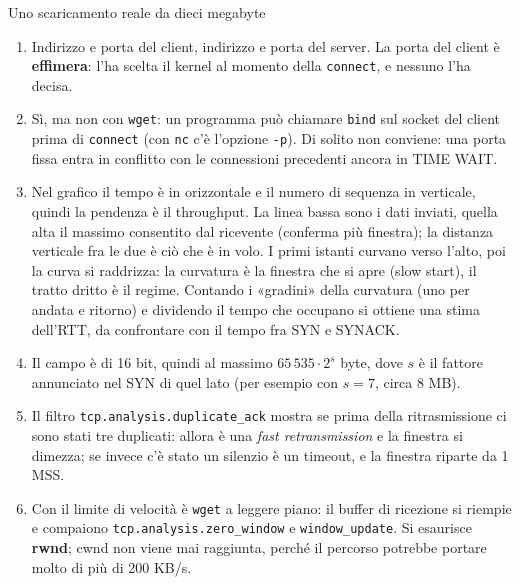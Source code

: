 \begin{esercizio}{Uno scaricamento reale da dieci megabyte}
\svolgimento
\begin{enumerate}[label=(\alph*)]
    \item Indirizzo e porta del client, indirizzo e porta del server. La porta del client è \textbf{effimera}: l'ha scelta il
          kernel al momento della \texttt{connect}, e nessuno l'ha decisa.
    \item Sì, ma non con \texttt{wget}: un programma può chiamare \texttt{bind} sul socket del client prima di
          \texttt{connect} (con \texttt{nc} c'è l'opzione \texttt{-p}). Di solito non conviene: una porta fissa entra in
          conflitto con le connessioni precedenti ancora in TIME WAIT.
    \item Nel grafico il tempo è in orizzontale e il numero di sequenza in verticale, quindi la pendenza è il throughput. La
          linea bassa sono i dati inviati, quella alta il massimo consentito dal ricevente (conferma più finestra); la distanza
          verticale fra le due è ciò che è in volo. I primi istanti curvano verso l'alto, poi la curva si raddrizza: la
          curvatura è la finestra che si apre (slow start), il tratto dritto è il regime. Contando i «gradini» della curvatura
          (uno per andata e ritorno) e dividendo il tempo che occupano si ottiene una stima dell'RTT, da confrontare con il
          tempo fra SYN e SYNACK.
    \item Il campo è di 16 bit, quindi al massimo $65\,535 \cdot 2^{s}$ byte, dove $s$ è il fattore annunciato nel SYN di
          quel lato (per esempio con $s = 7$, circa 8 MB).
    \item Il filtro \texttt{tcp.analysis.duplicate\_ack} mostra se prima della ritrasmissione ci sono stati tre duplicati:
          allora è una \emph{fast retransmission} e la finestra si dimezza; se invece c'è stato un silenzio è un timeout, e la
          finestra riparte da 1 MSS.
    \item Con il limite di velocità è \texttt{wget} a leggere piano: il buffer di ricezione si riempie e compaiono
          \texttt{tcp.analysis.zero\_window} e \texttt{window\_update}. Si esaurisce \textbf{rwnd}; cwnd non viene mai
          raggiunta, perché il percorso potrebbe portare molto di più di 200 KB/s.
\end{enumerate}
\end{esercizio}

